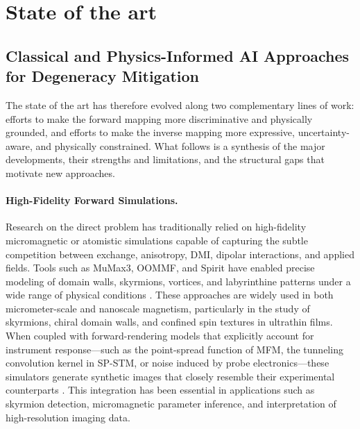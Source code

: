 \documentclass[letterpaper, 12, one column]{article}
\begin{document}
\bigskip




%


%



%
\section{State of the art}

\subsection{Classical and Physics-Informed AI Approaches for Degeneracy Mitigation}

The state of the art has therefore evolved along two complementary lines of work: efforts to make the forward mapping more discriminative and physically grounded, and efforts to make the inverse mapping more expressive, uncertainty-aware, and physically constrained. What follows is a synthesis of the major developments, their strengths and limitations, and the structural gaps that motivate new approaches.

\paragraph{High-Fidelity Forward Simulations.}
Research on the direct problem has traditionally relied on high-fidelity micromagnetic or atomistic simulations capable of capturing the subtle competition between exchange, anisotropy, DMI, dipolar interactions, and applied fields. Tools such as MuMax3, OOMMF, and Spirit have enabled precise modeling of domain walls, skyrmions, vortices, and labyrinthine patterns under a wide range of physical conditions \cite{Li2023Magnetic}. These approaches are widely used in both micrometer-scale and nanoscale magnetism, particularly in the study of skyrmions, chiral domain walls, and confined spin textures in ultrathin films. When coupled with forward-rendering models that explicitly account for instrument response—such as the point-spread function of MFM, the tunneling convolution kernel in SP-STM, or noise induced by probe electronics—these simulators generate synthetic images that closely resemble their experimental counterparts \cite{Li2023Magnetic}. This integration has been essential in applications such as skyrmion detection, micromagnetic parameter inference, and interpretation of high-resolution imaging data.
\end{document}
